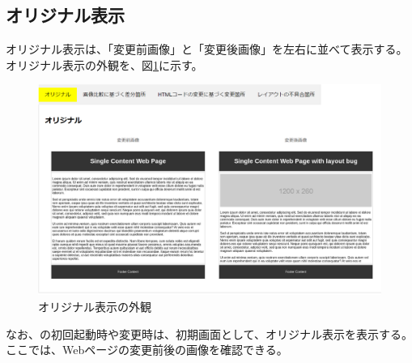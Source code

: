 \subsection{オリジナル表示}\label{subsec:original_tab}
オリジナル表示は、「変更前画像」と「変更後画像」を左右に並べて表示する。
オリジナル表示の外観を、図\ref{fig: Appearance_original_tab}に示す。
\begin{figure}[tp]
    \begin{center}
        \includegraphics[width=1.0\columnwidth]{image/new_original.png}
        \caption{オリジナル表示の外観}
        \label{fig: Appearance_original_tab}
    \end{center}
\end{figure}
なお、\toolName の初回起動時や変更時は、初期画面として、オリジナル表示を表示する。
ここでは、Webページの変更前後の画像を確認できる。

